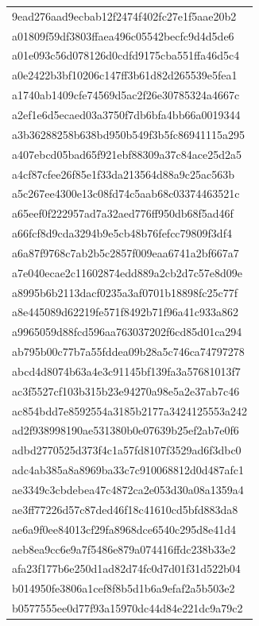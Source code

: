 \begin{tabular}{l}
9ead276aad9ecbab12f2474f402fc27e1f5aae20b2 \\
a01809f59df3803ffaea496c05542becfc9d4d5de6 \\
a01e093c56d078126d0cdfd9175cba551ffa46d5c4 \\
a0e2422b3bf10206c147ff3b61d82d265539e5fea1 \\
a1740ab1409cfe74569d5ac2f26e30785324a4667c \\
a2ef1e6d5ecaed03a3750f7db6bfa4bb66a0019344 \\
a3b36288258b638bd950b549f3b5fc86941115a295 \\
a407ebcd05bad65f921ebf88309a37c84ace25d2a5 \\
a4cf87cfee26f85e1f33da213564d88a9c25ac563b \\
a5c267ee4300e13c08fd74c5aab68c03374463521c \\
a65eef0f222957ad7a32aed776ff950db68f5ad46f \\
a66fcf8d9cda3294b9e5cb48b76fefcc79809f3df4 \\
a6a87f9768c7ab2b5c2857f009eaa6741a2bf667a7 \\
a7e040ecae2c11602874edd889a2cb2d7c57e8d09e \\
a8995b6b2113dacf0235a3af0701b18898fc25c77f \\
a8e445089d62219fe571f8492b71f96a41c933a862 \\
a9965059d88fcd596aa763037202f6cd85d01ca294 \\
ab795b00c77b7a55fddea09b28a5c746ca74797278 \\
abcd4d8074b63a4e3c91145bf139fa3a57681013f7 \\
ac3f5527cf103b315b23e94270a98e5a2e37ab7c46 \\
ac854bdd7e8592554a3185b2177a3424125553a242 \\
ad2f938998190ae531380b0e07639b25ef2ab7e0f6 \\
adbd2770525d373f4c1a57fd8107f3529ad6f3dbc0 \\
adc4ab385a8a8969ba33c7c910068812d0d487afc1 \\
ae3349c3cbdebea47c4872ca2e053d30a08a1359a4 \\
ae3ff77226d57c87ded46f18c41610cd5bfd883da8 \\
ae6a9f0ee84013cf29fa8968dce6540c295d8e41d4 \\
aeb8ea9cc6e9a7f5486e879a074416ffdc238b33e2 \\
afa23f177b6e250d1ad82d74fc0d7d01f31d522b04 \\
b014950fe3806a1cef8f8b5d1b6a9efaf2a5b503e2 \\
b0577555ee0d77f93a15970dc44d84e221dc9a79c2 \\

\end{tabular}
